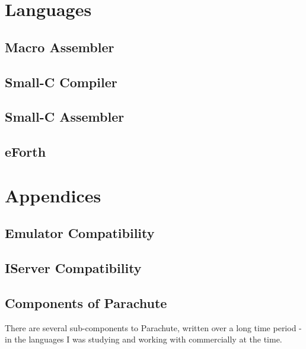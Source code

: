 \documentclass[a4paper]{tufte-book}
\begin{document}
\section{Languages}
\subsection{Macro Assembler}
\subsection{Small-C Compiler}
\subsection{Small-C Assembler}
\subsection{eForth}






\pagebreak
\appendix
\section*{Appendices}
\renewcommand{\thesubsection}{\Alph{subsection}}



\subsection{Emulator Compatibility}
\label{appendix:compatibility}

\subsection{IServer Compatibility}

\subsection{Components of Parachute}

There are several sub-components to Parachute, written over a long time period - in the languages I was studying and working with commercially at the time.

\vspace{5mm}
\end{document}
